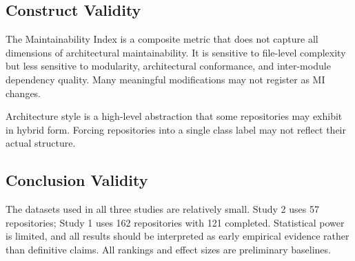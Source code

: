 \subsection{Construct Validity}

The Maintainability Index is a composite metric that does not capture all dimensions of architectural maintainability. It is sensitive to file-level complexity but less sensitive to modularity, architectural conformance, and inter-module dependency quality. Many meaningful modifications may not register as MI changes.

Architecture style is a high-level abstraction that some repositories may exhibit in hybrid form. Forcing repositories into a single class label may not reflect their actual structure.

\subsection{Conclusion Validity}

The datasets used in all three studies are relatively small. Study 2 uses 57 repositories; Study 1 uses 162 repositories with 121 completed. Statistical power is limited, and all results should be interpreted as early empirical evidence rather than definitive claims. All rankings and effect sizes are preliminary baselines.
